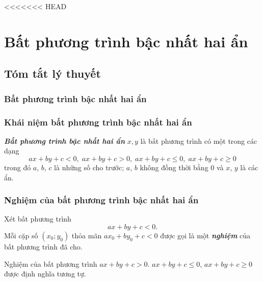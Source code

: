 <<<<<<< HEAD
\section{Bất phương trình bậc nhất hai ẩn}
\setcounter{dang}{0}
\subsection{Tóm tắt lý thuyết}
\subsubsection{Bất phương trình bậc nhất hai ẩn}
\subsubsection{Khái niệm bất phương trình bậc nhất hai ẩn}
\begin{boxdn}
	\textbf{\textit{Bất phương trình bậc nhất hai ẩn}} $x, y$ là bất phương trình có một trong các dạng
	$$ax+by+c<0,\; ax+by+c>0 ,\; ax+by+c \leq 0 ,\; a x+b y+c \geq 0$$
	trong đó $a$, $b$, $c$ là những số cho trước; $a$, $b$ không đồng thời bằng $0$ và $x$, $y$ là các ẩn.
\end{boxdn}
\subsubsection{Nghiệm của bất phương trình bậc nhất hai ẩn}
\begin{boxdn}
	Xét bất phương trình $$ax+by+c<0.$$
	Mỗi cặp số $(x_0;y_0)$ thỏa mãn $ax_0+by_0+c<0$ được gọi là một \textbf{\textit{nghiệm}} của bất phương trình đã cho.
\end{boxdn}
\begin{note}
	Nghiệm của bất phương trình $ax+by+c>0$. $ax+by+c \leq 0$, $ax+by+c \geq 0$ được định nghĩa tương tự.
\end{note}
